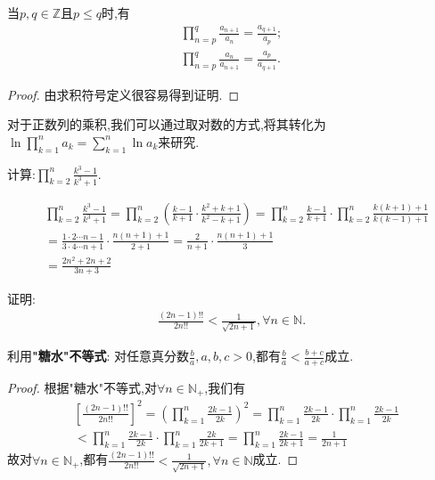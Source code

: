 \documentclass[lang=cn,newtx,10pt,scheme=chinese]{elegantbook}
\begin{document}
\begin{theorem}[基本结论]\label{theorem:求积符号基本结论}
   当$p,q\in \mathbb{Z}$且$p\leq q$时,有
   \begin{gather*}
      \prod_{n=p}^q{\frac{a_{n+1}}{a_n}}=\frac{a_{q+1}}{a_p};
\\
\prod_{n=p}^q{\frac{a_n}{a_{n+1}}}=\frac{a_p}{a_{q+1}}.
   \end{gather*}
\end{theorem}
\begin{proof}
   由求积符号定义很容易得到证明.
\end{proof}
\begin{remark}
   对于正数列的乘积,我们可以通过取对数的方式,将其转化为$\ln \prod_{k=1}^n{a_k}=\sum\limits_{k=1}^n{\ln a_k}$来研究.
\end{remark}
\begin{example}
   计算:$\prod_{k=2}^n{\frac{k^3-1}{k^3+1}}$.
\end{example}
\begin{solution}
   \begin{align*}
      &\prod_{k=2}^n{\frac{k^3-1}{k^3+1}}=\prod_{k=2}^n{\left( \frac{k-1}{k+1}\cdot \frac{k^2+k+1}{k^2-k+1} \right)}=\prod_{k=2}^n{\frac{k-1}{k+1}\cdot}\prod_{k=2}^n{\frac{k\left( k+1 \right) +1}{k\left( k-1 \right) +1}}
\\
&=\frac{1\cdot 2\cdots n-1}{3\cdot 4\cdots n+1}\cdot \frac{n\left( n+1 \right) +1}{2+1}=\frac{2}{n+1}\cdot \frac{n\left( n+1 \right) +1}{3}
\\
&=\frac{2n^2+2n+2}{3n+3}
   \end{align*}
\end{solution}

\begin{example}
   证明:\begin{align*}
      \frac{\left( 2n-1 \right) !!}{2n!!}<\frac{1}{\sqrt{2n+1}},\forall n\in \mathbb{N} .
   \end{align*}
\end{example}
\begin{note}
   利用\hypertarget{"糖水"不等式}{\textbf{"糖水"不等式}}:
   对任意真分数$\frac{b}{a},a,b,c>0$,都有$\frac{b}{a}<\frac{b+c}{a+c}$成立.
\end{note}
\begin{proof}
   根据\hypertarget{"糖水"不等式}{"糖水"不等式},对$\forall n\in \mathbb{N}_+$,我们有
   \begin{align*}
      &\left[ \frac{\left( 2n-1 \right) !!}{2n!!} \right] ^2=\left( \prod_{k=1}^n{\frac{2k-1}{2k}} \right) ^2=\prod_{k=1}^n{\frac{2k-1}{2k}}\cdot \prod_{k=1}^n{\frac{2k-1}{2k}}
\\
&<\prod_{k=1}^n{\frac{2k-1}{2k}}\cdot \prod_{k=1}^n{\frac{2k}{2k+1}}=\prod_{k=1}^n{\frac{2k-1}{2k+1}}=\frac{1}{2n+1}
   \end{align*}
故对$\forall n\in \mathbb{N}_+$,都有$\frac{\left( 2n-1 \right) !!}{2n!!}<\frac{1}{\sqrt{2n+1}},\forall n\in \mathbb{N}$成立.
\end{proof}
\end{document}
